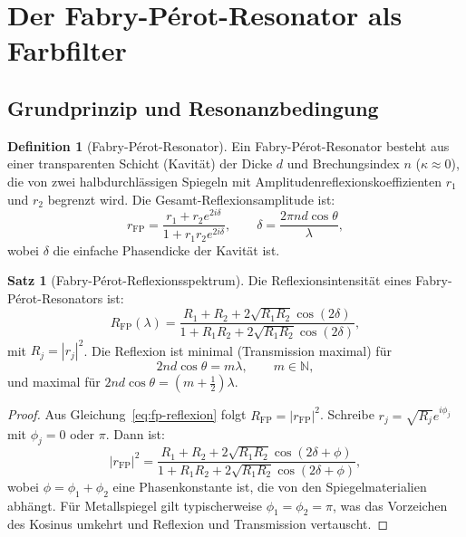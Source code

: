 ﻿\documentclass[a4paper,12pt]{article}
\theoremstyle{definition}
\newtheorem{definition}{Definition}[section]
\newtheorem{satz}{Satz}[section]
\begin{document}
	\section{Der Fabry-Pérot-Resonator als Farbfilter}
	\label{sec:fabry-perot}
	
	\subsection{Grundprinzip und Resonanzbedingung}
	
	\begin{definition}[Fabry-Pérot-Resonator]
		\label{def:fp-resonator}
		Ein Fabry-Pérot-Resonator besteht aus einer transparenten Schicht
		(Kavität) der Dicke $d$ und Brechungsindex $n$ ($\kappa \approx 0$),
		die von zwei halbdurchlässigen Spiegeln mit Amplitudenreflexionskoeffizienten
		$r_1$ und $r_2$ begrenzt wird. Die Gesamt-Reflexionsamplitude ist:
		\begin{equation}
			r_\mathrm{FP} = \frac{r_1 + r_2 e^{2i\delta}}{1 + r_1 r_2 e^{2i\delta}},
			\qquad \delta = \frac{2\pi n d \cos\theta}{\lambda},
			\label{eq:fp-reflexion}
		\end{equation}
		wobei $\delta$ die einfache Phasendicke der Kavität ist.
	\end{definition}
	
	\begin{satz}[Fabry-Pérot-Reflexionsspektrum]
		\label{satz:fp-spektrum}
		Die Reflexionsintensität eines Fabry-Pérot-Resonators ist:
		\begin{equation}
			R_\mathrm{FP}(\lambda) = \frac{R_1 + R_2 + 2\sqrt{R_1 R_2}\cos(2\delta)}
			{1 + R_1 R_2 + 2\sqrt{R_1 R_2}\cos(2\delta)},
			\label{eq:fp-intensitaet}
		\end{equation}
		mit $R_j = |r_j|^2$. Die Reflexion ist minimal (Transmission maximal) für
		\begin{equation}
			2 n d \cos\theta = m\lambda, \qquad m \in \mathbb{N},
			\label{eq:fp-resonanz}
		\end{equation}
		und maximal für $2nd\cos\theta = (m + \tfrac{1}{2})\lambda$.
	\end{satz}
	
	\begin{proof}
		Aus Gleichung~\eqref{eq:fp-reflexion} folgt $R_\mathrm{FP} = |r_\mathrm{FP}|^2$.
		Schreibe $r_j = \sqrt{R_j} e^{i\phi_j}$ mit $\phi_j = 0$ oder $\pi$.
		Dann ist:
		\[
		|r_\mathrm{FP}|^2 = \frac{R_1 + R_2 + 2\sqrt{R_1 R_2}\cos(2\delta + \phi)}
		{1 + R_1 R_2 + 2\sqrt{R_1 R_2}\cos(2\delta + \phi)},
		\]
		wobei $\phi = \phi_1 + \phi_2$ eine Phasenkonstante ist, die von den
		Spiegelmaterialien abhängt. Für Metallspiegel gilt typischerweise
		$\phi_1 = \phi_2 = \pi$, was das Vorzeichen des Kosinus umkehrt und
		Reflexion und Transmission vertauscht.
	\end{proof}
	
\end{document}
